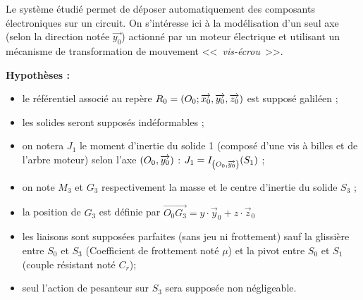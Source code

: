 \documentclass[10pt,fleqn]{article} %
\begin{document}
\def\pathfig{images}

\vspace{4.5cm}
\pagestyle{fancy}
\thispagestyle{plain}

\def\columnseprulecolor{\color{ocre}}
\setlength{\columnseprule}{0.4pt} 

\def\pathfig{images}

\ifprof
\else
\begin{multicols}{2}
\fi


Le système étudié permet de déposer automatiquement des composants électroniques sur un circuit.
On s'intéresse ici à la modélisation d'un seul axe (selon la direction notée $\overrightarrow{y_0}$) actionné par un moteur électrique et utilisant un mécanisme de transformation de mouvement <<~\textit{vis-écrou}~>>.

\textbf{Hypothèses :}
\begin{itemize}
\item le référentiel associé au repère $R_0=\left(O_0;\overrightarrow{x_0},\overrightarrow{y_0},\overrightarrow{z_0} \right)$ est supposé galiléen ;
\item les solides seront supposés indéformables ; 
\item on notera $J_1$ le moment d'inertie du solide 1 (composé d'une vis à billes et de l'arbre moteur) selon l'axe $\left(O_0,\overrightarrow{{y_0}}\right)$ : $J_1=I_{\left(O_0,\overrightarrow{{y_0}}\right)}(S_1)$ ;
\item on note $M_3$ et $G_3$ respectivement la masse et le centre d'inertie du solide $S_3$ ;
\item la position de $G_3$ est définie par $\overrightarrow{O_0G_3}=y\cdot \overrightarrow{y}_0+z\cdot \overrightarrow{z}_0$
\item les liaisons sont supposées parfaites (sans jeu ni frottement) sauf la glissière entre $S_0$ et $S_3$ (Coefficient de frottement noté $\mu$) et la pivot entre $S_0$ et $S_1$ (couple résistant noté $C_r$);
\item seul l'action de pesanteur sur $S_3$ sera supposée non négligeable.
\end{itemize}

\begin{center}


\end{center}
\end{multicols}
\end{document}
